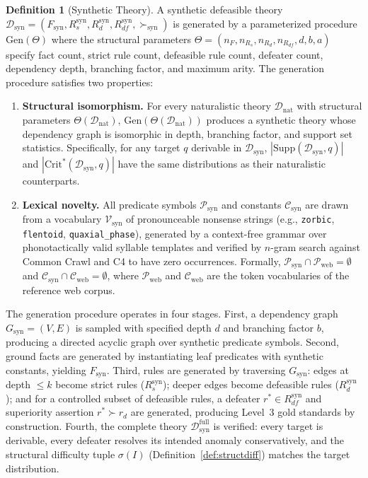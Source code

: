 \documentclass{article}
\theoremstyle{definition}
\newtheorem{definition}[theorem]{Definition}
\newcommand{\D}{\mathcal{D}}
\newcommand{\Dfull}{\mathcal{D}^{\mathrm{full}}}
\newcommand{\Rs}{R_s}
\newcommand{\Rd}{R_d}
\newcommand{\Rdf}{R_{df}}
\newcommand{\Supp}{\mathrm{Supp}}
\newcommand{\CritStar}{\mathrm{Crit}^{*}}
\begin{document}
\begin{definition}[Synthetic Theory]\label{def:synththeory}
A synthetic defeasible theory $\D_{\mathrm{syn}} = (F_{\mathrm{syn}}, \Rs^{\mathrm{syn}}, \Rd^{\mathrm{syn}}, \Rdf^{\mathrm{syn}}, {\succ_{\mathrm{syn}}})$ is generated by a parameterized procedure $\mathrm{Gen}(\Theta)$ where the structural parameters $\Theta = (n_F, n_{\Rs}, n_{\Rd}, n_{\Rdf}, d, b, a)$ specify fact count, strict rule count, defeasible rule count, defeater count, dependency depth, branching factor, and maximum arity. The generation procedure satisfies two properties:
\begin{enumerate}[label=(\roman*),nosep]
    \item \textbf{Structural isomorphism.} For every naturalistic theory $\D_{\mathrm{nat}}$ with structural parameters $\Theta(\D_{\mathrm{nat}})$, $\mathrm{Gen}(\Theta(\D_{\mathrm{nat}}))$ produces a synthetic theory whose dependency graph is isomorphic in depth, branching factor, and support set statistics. Specifically, for any target $q$ derivable in $\D_{\mathrm{syn}}$, $|\Supp(\D_{\mathrm{syn}}, q)|$ and $|\CritStar(\D_{\mathrm{syn}}, q)|$ have the same distributions as their naturalistic counterparts.
    \item \textbf{Lexical novelty.} All predicate symbols $\mathcal{P}_{\mathrm{syn}}$ and constants $\mathcal{C}_{\mathrm{syn}}$ are drawn from a vocabulary $\mathcal{V}_{\mathrm{syn}}$ of pronounceable nonsense strings (e.g., \texttt{zorbic}, \texttt{flentoid}, \texttt{quaxial\_phase}), generated by a context-free grammar over phonotactically valid syllable templates and verified by $n$-gram search against Common Crawl and C4 to have zero occurrences. Formally, $\mathcal{P}_{\mathrm{syn}} \cap \mathcal{P}_{\mathrm{web}} = \emptyset$ and $\mathcal{C}_{\mathrm{syn}} \cap \mathcal{C}_{\mathrm{web}} = \emptyset$, where $\mathcal{P}_{\mathrm{web}}$ and $\mathcal{C}_{\mathrm{web}}$ are the token vocabularies of the reference web corpus.
\end{enumerate}
\end{definition}

The generation procedure operates in four stages. First, a dependency graph $G_{\mathrm{syn}} = (V, E)$ is sampled with specified depth $d$ and branching factor $b$, producing a directed acyclic graph over synthetic predicate symbols. Second, ground facts are generated by instantiating leaf predicates with synthetic constants, yielding $F_{\mathrm{syn}}$. Third, rules are generated by traversing $G_{\mathrm{syn}}$: edges at depth $\leq k$ become strict rules ($\Rs^{\mathrm{syn}}$); deeper edges become defeasible rules ($\Rd^{\mathrm{syn}}$); and for a controlled subset of defeasible rules, a defeater $r^* \in \Rdf^{\mathrm{syn}}$ and superiority assertion $r^* \succ r_d$ are generated, producing Level~3 gold standards by construction. Fourth, the complete theory $\Dfull_{\mathrm{syn}}$ is verified: every target is derivable, every defeater resolves its intended anomaly conservatively, and the structural difficulty tuple $\sigma(I)$ (Definition~\ref{def:structdiff}) matches the target distribution.
\end{document}
